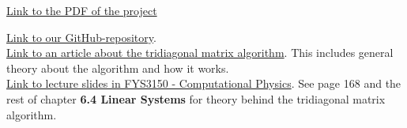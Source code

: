 \documentclass{article}
\begin{document}
\href{https://github.com/CompPhysics/ComputationalPhysics/blob/master/doc/Projects/2019/Project1/pdf/Project1.pdf}{Link to the PDF of the project}

\href{https://github.com/Erikbgram/Fys3150}{Link to our GitHub-repository}. \\

\href{http://www.industrial-maths.com/ms6021_thomas.pdf}{Link to an article about the tridiagonal matrix algorithm}. This includes general theory about the algorithm and how it works. \\

\href{https://github.com/CompPhysics/ComputationalPhysics/blob/master/doc/Lectures/lectures2015.pdf}{Link to lecture slides in FYS3150 - Computational Physics}. See page 168 and the rest of chapter \textbf{6.4 Linear Systems} for theory behind the tridiagonal matrix algorithm.






\end{document}
